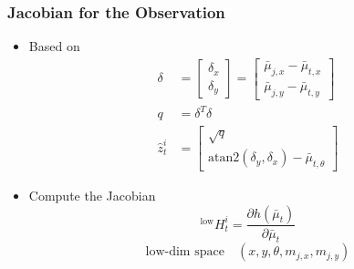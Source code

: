 \begin{frame}
    \frametitle{Jacobian for the Observation}

    \begin{itemize}
        \item Based on
        \begin{align*}
            \delta &= 
            \begin{bmatrix}
                \delta_x \\
                \delta_y
            \end{bmatrix}
            = \begin{bmatrix}
                \bar{\mu}_{j,x} - \bar{\mu}_{t,x} \\
                \bar{\mu}_{j,y} - \bar{\mu}_{t,y}
            \end{bmatrix}\\
            q &= \delta^T \delta\\
            \hat{z}^i_t &= 
            \begin{bmatrix}
                \sqrt{q} \\
                \text{atan2}(\delta_y, \delta_x) - \bar{\mu}_{t,\theta}
            \end{bmatrix}
        \end{align*}    
        \item Compute the Jacobian
        \begin{equation*}
            {}^{\text{low}}H^i_t = \frac{\partial h(\bar{\mu}_t)}{\partial \bar{\mu}_t}
        \end{equation*}
        \begin{equation*}
            \text{low-dim space} \quad (x, y, \theta, m_{j,x}, m_{j,y})
        \end{equation*}
    \end{itemize}
\end{frame}

